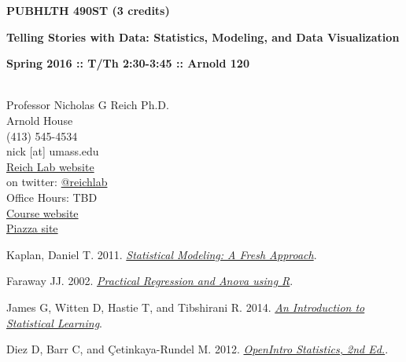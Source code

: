 \documentclass[10pt]{article}
\begin{document}
\centerline{\bf \large PUBHLTH 490ST (3 credits)} 
\centerline{\bf \large Telling Stories with Data: Statistics, Modeling, and Data Visualization}
\centerline{\bf Spring 2016 :: T/Th 2:30-3:45  :: Arnold 120 }

\vspace{.25in}
\\
\noindent Professor Nicholas G Reich Ph.D. \\
 Arnold House \\
\noindent (413) 545-4534 \\
\noindent nick [at] umass.edu \\
\noindent \href{http://reichlab.github.io}{Reich Lab website}\\
\noindent on twitter: \href{https://twitter.com/reichlab}{@reichlab}\\
\noindent Office Hours: TBD \\
\noindent \href{http://nickreich.github.io/data-stories-2016/}{Course website}\\
\noindent \href{https://piazza.com/umass/spring2016/pubhlth490st/home}{Piazza site}


\bigskip
{}


Kaplan, Daniel T. 2011. \emph{\href{http://www.mosaic-web.org/go/StatisticalModeling/}{Statistical Modeling: A Fresh Approach}}.
  


Faraway JJ. 2002. \emph{\href{http://cran.r-project.org/doc/contrib/Faraway-PRA.pdf}{Practical Regression and Anova using R}}.
  
James G, Witten D, Hastie T, and Tibshirani R. 2014. \emph{\href{http://www-bcf.usc.edu/~gareth/ISL/}{An Introduction to Statistical Learning}}.
  
Diez D, Barr C, and \c{C}etinkaya-Rundel M. 2012. \emph{\href{http://www.openintro.org/stat/index.php}{OpenIntro Statistics, 2nd Ed.}}.

\end{document}
